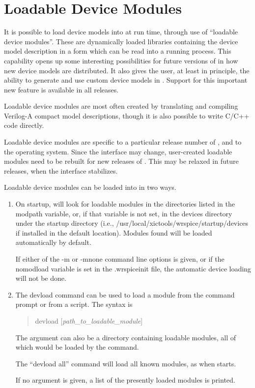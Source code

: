  
\section{Loadable Device Modules}
\label{loadable}


It is possible to load device models into {\WRspice} at run time,
through use of ``loadable device modules''.  These are dynamically
loaded libraries containing the device model description in a form
which can be read into a running {\WRspice} process.  This capability
opens up some interesting possibilities for future versions of
{\WRspice} in how new device models are distributed.  It also gives
the user, at least in principle, the ability to generate and use
custom device models in {\WRspice}.
Support for this important new feature is available in all
releases.

Loadable device modules are most often created by translating and
compiling Verilog-A compact model descriptions, though it is also
possible to write C/C++ code directly.

Loadable device modules are specific to a particular release number of
{\WRspice}, and to the operating system.  Since the interface may
change, user-created loadable modules need to be rebuilt for new
releases of {\WRspice}.  This may be relaxed in future releases, when
the interface stabilizes.

Loadable device modules can be loaded into {\WRspice} in two ways.

\begin{enumerate}
\item{On startup, {\WRspice} will look for loadable modules in the
directories listed in the {\vt modpath} variable, or, if that variable
is not set, in the {\vt devices} directory under the {\vt startup}
directory (i.e., {\vt /usr/local/xictools/wrspice/startup/devices} if
installed in the default location).  Modules found will be loaded
automatically by default.

If either of the {\vt -m} or {\vt -mnone} command line options is
given, or if the {\vt nomodload} variable is set in the {\vt
.wrspiceinit} file, the automatic device loading will not be done.}

\item{The {\cb devload} command can be used to load a module from the
command prompt or from a script.  The syntax is
\begin{quote}
{\vt devload} [{\it path\_to\_loadable\_module\/}]
\end{quote}

The argument can also be a directory containing loadable modules, all
of which would be loaded by the command.

The ``{\vt devload all}'' command will load all known modules, as when
{\WRspice} starts.

If no argument is given, a list of the presently loaded modules
is printed. }
\end{enumerate}

